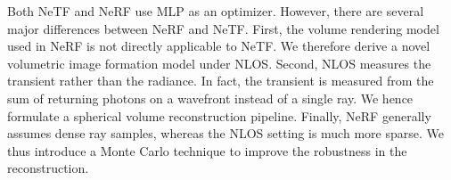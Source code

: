 \documentclass[10pt,journal,compsoc]{IEEEtran}
\begin{document}
Both NeTF and NeRF use MLP as an optimizer. However, there are several major differences between NeRF and NeTF. First, the volume rendering model used in NeRF is not directly applicable to NeTF. We therefore derive a novel volumetric image formation model under NLOS. Second, NLOS measures the transient rather than the radiance. In fact, the transient is measured from the sum of returning photons on a wavefront instead of a single ray. We hence formulate a spherical volume reconstruction pipeline. Finally, NeRF generally assumes dense ray samples, whereas the NLOS setting is much more sparse. We thus introduce a Monte Carlo technique to improve the robustness in the reconstruction. 


\end{document}
